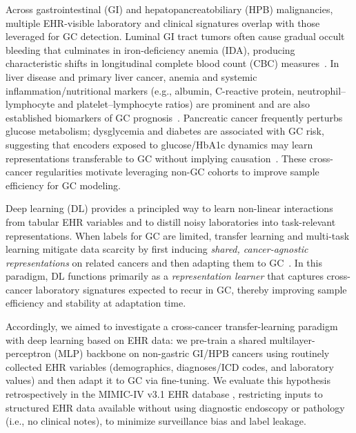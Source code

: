 \documentclass[diagnostics,article,submit,pdftex,moreauthors]{Definitions/mdpi}
\begin{document}
Across gastrointestinal (GI) and hepatopancreatobiliary (HPB) malignancies, multiple EHR-visible laboratory and clinical signatures overlap with those leveraged for GC detection. 
Luminal GI tract tumors often cause gradual occult bleeding that culminates in iron-deficiency anemia (IDA), producing characteristic shifts in longitudinal complete blood count (CBC) measures~\citep{read2023cancers,Aksoy2019CBC,Krieg2024IDA,Kim2014GIBleed}. 
In liver disease and primary liver cancer, anemia and systemic inflammation/nutritional markers (e.g., albumin, C-reactive protein, neutrophil–lymphocyte and platelet–lymphocyte ratios) are prominent and are also established biomarkers of GC prognosis~\citep{Stein2016Anemia,Gkamprela2017CLDIDA,Crumley2010Albumin,Kim2020Inflam}. 
Pancreatic cancer frequently perturbs glucose metabolism; dysglycemia and diabetes are associated with GC risk, suggesting that encoders exposed to glucose/HbA1c dynamics may learn representations transferable to GC without implying causation~\citep{Shimoyama2013DMGC,Yoon2013DMGC,Guo2022DMGC}. 
These cross-cancer regularities motivate leveraging non-GC cohorts to improve sample efficiency for GC modeling.

Deep learning (DL) provides a principled way to learn non-linear interactions from tabular EHR variables and to distill noisy laboratories into task-relevant representations. 
When labels for GC are limited, transfer learning and multi-task learning mitigate data scarcity by first inducing \emph{shared, cancer-agnostic representations} on related cancers and then adapting them to GC~\citep{Caruana1997_MTL,Pan2010_TLsurvey,Yosinski2014_transferable}. 
In this paradigm, DL functions primarily as a \emph{representation learner} that captures cross-cancer laboratory signatures expected to recur in GC, thereby improving sample efficiency and stability at adaptation time.

Accordingly, we aimed to investigate a cross-cancer transfer-learning paradigm with deep learning based on EHR data: we pre-train a shared multilayer-perceptron (MLP) backbone on non-gastric GI/HPB cancers using routinely collected EHR variables (demographics, diagnoses/ICD codes, and laboratory values) and then adapt it to GC via fine-tuning. 
We evaluate this hypothesis retrospectively in the MIMIC-IV v3.1 EHR database \citep{Johnson2024MIMICIV}, restricting inputs to structured EHR data available without using diagnostic endoscopy or pathology (i.e., no clinical notes), to minimize surveillance bias and label leakage.
\end{document}
